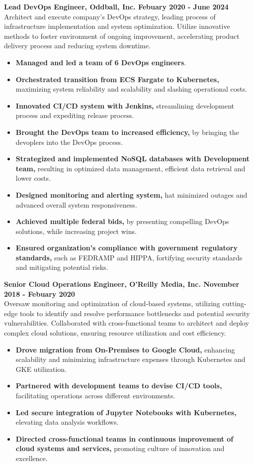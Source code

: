 \documentclass[10pt]{article}
\begin{document}
\normalsize
\textbf{Lead DevOps Engineer, Oddball, Inc. \hfill{Febuary 2020 - June 2024}}\\
\normalsize Architect and execute company's DevOps strategy, leading process of infrastructure implementation and system optimization. 
Utilize innovative methods to foster environment of ongoing improvement, accelerating product delivery process and reducing system downtime.
\begin{itemize}
\small
\item \textbf{Managed and led a team of 6 DevOps engineers}.
\item \textbf{Orchestrated transition from ECS Fargate to Kubernetes,} maximizing system reliability and scalability and slashing operational costs.
\item \textbf{Innovated CI/CD system with Jenkins,} streamlining development process and expediting release process.
\item \textbf{Brought the DevOps team to increased efficiency,} by bringing the devoplers into the DevOps process.
\item \textbf{Strategized and implemented NoSQL databases with Development team,} resulting in optimized data management,
efficient data retrieval and lower costs.
\item \textbf{Designed monitoring and alerting system,} hat minimized outages and advanced overall system responsiveness.
\item \textbf{Achieved multiple federal bids,} by presenting compelling DevOps solutions, while increasing project wins.
\item \textbf{Ensured organization's compliance with government regulatory standards,} such as FEDRAMP and HIPPA, fortifying
security standards and mitigating potential risks.
\end{itemize}

\normalsize
\noindent\textbf{Senior Cloud Operations Engineer, O'Reilly Media, Inc. \hfill{November 2018 - Febuary 2020}}\\
\normalsize Oversaw monitoring and optimization of cloud-based systems, utilizing cutting-edge tools to identify and resolve 
performance bottlenecks and potential security vulnerabilities. Collaborated with cross-functional teams to architect and deploy complex 
cloud solutions, ensuring resource utilization and cost efficiency.
\begin{itemize}
\small
\item \textbf{Drove migration from On-Premises to Google Cloud,} enhancing scalability and minimizing infrastructure expenses through Kubernetes and GKE utilization.
\item \textbf{Partnered with development teams to devise CI/CD tools,} facilitating operations across different environments.
\item \textbf{Led secure integration of Jupyter Notebooks with Kubernetes,} elevating data analysis workflows.
\item \textbf{Directed cross-functional teams in continuous improvement of cloud systems and services,} promoting culture of
innovation and excellence.
\end{itemize}
\end{document}
